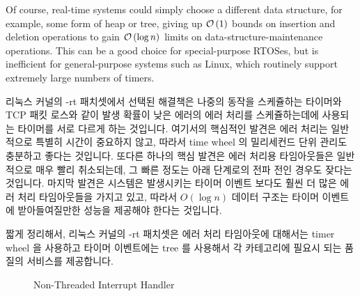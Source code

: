Of course, real-time systems could simply choose a different data
structure, for example, some form of heap or tree, giving up
$\mathcal{O}\left(1\right)$ bounds on insertion and deletion operations to gain $\mathcal{O}\left(\log n\right)$
limits on data-structure-maintenance operations.
This can be a good choice for special-purpose RTOSes, but is inefficient
for general-purpose systems such as Linux, which routinely support
extremely large numbers of timers.
\fi

리눅스 커널의 -rt 패치셋에서 선택된 해결책은 나중의 동작을 스케쥴하는 타이머와
TCP 패킷 로스와 같이 발생 확률이 낮은 에러의 에러 처리를 스케쥴하는데에
사용되는 타이머를 서로 다르게 하는 것입니다.
여기서의 핵심적인 발견은 에러 처리는 일반적으로 특별히 시간이 중요하지 않고,
따라서 time wheel 의 밀리세컨드 단위 관리도 충분하고 좋다는 것입니다.
또다른 하나의 핵심 발견은 에러 처리용 타임아웃들은 일반적으로 매우 빨리
취소되는데, 그 빠른 정도는 아래 단계로의 전파 전인 경우도 잦다는 것입니다.
마지막 발견은 시스템은 발생시키는 타이머 이벤트 보다도 훨씬 더 많은 에러 처리
타임아웃들을 가지고 있고, 따라서 $O(\log n)$ 데이터 구조는 타이머 이벤트에
받아들여질만한 성능을 제공해야 한다는 것입니다.

짧게 정리해서, 리눅스 커널의 -rt 패치셋은 에러 처리 타임아웃에 대해서는 timer
wheel 을 사용하고 타이머 이벤트에는 tree 를 사용해서 각 카테고리에 필요시 되는
품질의 서비스를 제공합니다.

\begin{figure}[tb]
\centering
{}
\caption{Non-Threaded Interrupt Handler}
\label{fig:advsync:Non-Threaded Interrupt Handler}
\end{figure}


